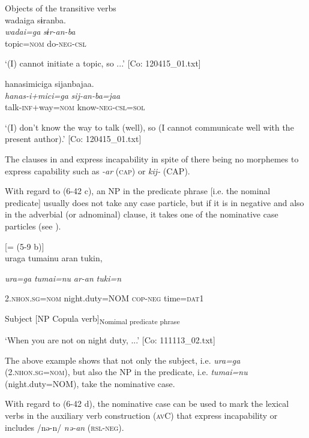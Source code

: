 \ea\label{ex:6-46}
 Objects of the transitive verbs\\

 \ea {\TM}  {\textbar}wadai{\textbar}ga  sɨranba.\\
\gll \textit{wadai=ga}  \textit{sɨr-an-ba}\\

      topic=\textsc{nom}  do-\textsc{neg}-\textsc{csl}

\glt ‘(I) cannot initiate a topic, so ...’ [Co: 120415\_01.txt]
\z

 \ex {\TM}  hanasimiciga  sijanbajaa.\\
\gll \textit{hanas-i+mici=ga}  \textit{sij-an-ba=jaa}\\

      talk-\textsc{inf}+way=\textsc{nom}  know-\textsc{neg}-\textsc{csl}=\textsc{sol}

\glt ‘(I) don’t know the way to talk (well), so (I cannot communicate well with the present author).’ [Co: 120415\_01.txt]
\z

The clauses in  and  express incapability in spite of there being no morphemes to express capability such as \textit{{}-ar} (\textsc{cap}) or \textit{kij-} (CAP).

  With regard to (6-42 c), an NP in the predicate phrase [i.e. the nominal predicate] usually does not take any case particle, but if it is in negative and also in the adverbial (or adnominal) clause, it takes one of the nominative case particles (see ).

\ea\label{ex:6-47}
 [= (5-9 b)]\\

{\TM}
\gll uraga  tumainu  aran  tukin,

    \textit{ura=ga}  \textit{tumai=nu}  \textit{ar-an}  \textit{tuki=n}

    2.\textsc{nhon}.\textsc{sg}=\textsc{nom}  night.duty=NOM  \textsc{cop}-\textsc{neg}  time=\textsc{dat}1

    Subject  [NP  Copula verb]\textsubscript{Nomimal predicate phrase}  

\glt    ‘When you are not on night duty, ...’ [Co: 111113\_02.txt]
\z

The above example shows that not only the subject, i.e. \textit{ura=ga} (2.\textsc{nhon}.\textsc{sg}=\textsc{nom}), but also the NP in the predicate, i.e. \textit{tumai=nu} (night.duty=NOM), take the nominative case.

  With regard to (6-42 d), the nominative case can be used to mark the lexical verbs in the auxiliary verb construction (\textsc{av}C) that express incapability or includes /nə-n/ \textit{nə-an} (\textsc{rsl}-\textsc{neg}).

